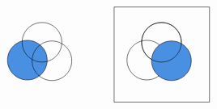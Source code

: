 \documentclass[12pt]{article}
\begin{document}
\[\begin{tikzpicture}[x=0.75pt,y=0.75pt,yscale=-1.08,xscale=1.08]
    \draw  [fill={rgb, 255:red, 74; green, 144; blue, 226 }  ,fill opacity=1 ] (304,67.96) .. controls (304,56.04) and (313.66,46.38) .. (325.58,46.38) .. controls (337.5,46.38) and (347.16,56.04) .. (347.16,67.96) .. controls (347.16,79.88) and (337.5,89.54) .. (325.58,89.54) .. controls (313.66,89.54) and (304,79.88) .. (304,67.96) -- cycle ;
    \draw   (330.77,68.67) .. controls (330.77,56.75) and (340.44,47.09) .. (352.35,47.09) .. controls (364.27,47.09) and (373.93,56.75) .. (373.93,68.67) .. controls (373.93,80.58) and (364.27,90.24) .. (352.35,90.24) .. controls (340.44,90.24) and (330.77,80.58) .. (330.77,68.67) -- cycle ;
    \draw   (319.94,48.5) .. controls (319.94,36.58) and (329.61,26.92) .. (341.52,26.92) .. controls (353.44,26.92) and (363.1,36.58) .. (363.1,48.5) .. controls (363.1,60.41) and (353.44,70.07) .. (341.52,70.07) .. controls (329.61,70.07) and (319.94,60.41) .. (319.94,48.5) -- cycle ;
    \draw   (420,10) -- (523.74,10) -- (523.74,113.74) -- (420,113.74) -- cycle ;
    \draw   (449.94,48.5) .. controls (449.94,36.58) and (459.61,26.92) .. (471.52,26.92) .. controls (483.44,26.92) and (493.1,36.58) .. (493.1,48.5) .. controls (493.1,60.41) and (483.44,70.07) .. (471.52,70.07) .. controls (459.61,70.07) and (449.94,60.41) .. (449.94,48.5) -- cycle ;
    \draw   (434,67.96) .. controls (434,56.04) and (443.66,46.38) .. (455.58,46.38) .. controls (467.5,46.38) and (477.16,56.04) .. (477.16,67.96) .. controls (477.16,79.88) and (467.5,89.54) .. (455.58,89.54) .. controls (443.66,89.54) and (434,79.88) .. (434,67.96) -- cycle ;
    \draw  [fill={rgb, 255:red, 74; green, 144; blue, 226 }  ,fill opacity=1 ] (460.77,68.67) .. controls (460.77,56.75) and (470.44,47.09) .. (482.35,47.09) .. controls (494.27,47.09) and (503.93,56.75) .. (503.93,68.67) .. controls (503.93,80.58) and (494.27,90.24) .. (482.35,90.24) .. controls (470.44,90.24) and (460.77,80.58) .. (460.77,68.67) -- cycle ;
    \draw   (449.94,48.5) .. controls (449.94,36.58) and (459.61,26.92) .. (471.52,26.92) .. controls (483.44,26.92) and (493.1,36.58) .. (493.1,48.5) .. controls (493.1,60.41) and (483.44,70.07) .. (471.52,70.07) .. controls (459.61,70.07) and (449.94,60.41) .. (449.94,48.5) -- cycle ;

\end{tikzpicture}\]
\end{document}
